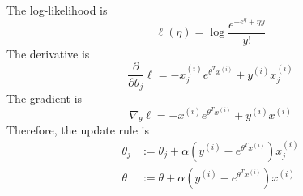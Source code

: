 \begin{answer}
    \\
    The log-likelihood is
    $$
    \ell(\eta) = \log \frac{e^{-e^\eta + \eta y}}{y!}
    $$
    The derivative is
    $$
    \frac{\partial}{\partial \theta_j} \ell = - x_j^{(i)} e^{\theta^T x^{(i)}} + y^{(i)} x_j^{(i)}
    $$
    The gradient is
    $$
    \nabla_\theta \ell = - x^{(i)} e^{\theta^T x^{(i)}} + y^{(i)} x^{(i)}
    $$
    Therefore, the update rule is
    \begin{align*}
        \theta_j &:= \theta_j + \alpha \left( y^{(i)} - e^{\theta^T x^{(i)}} \right) x_j^{(i)} \\
        \theta   &:= \theta + \alpha \left( y^{(i)} - e^{\theta^T x^{(i)}} \right) x^{(i)}    
    \end{align*}
\end{answer}
